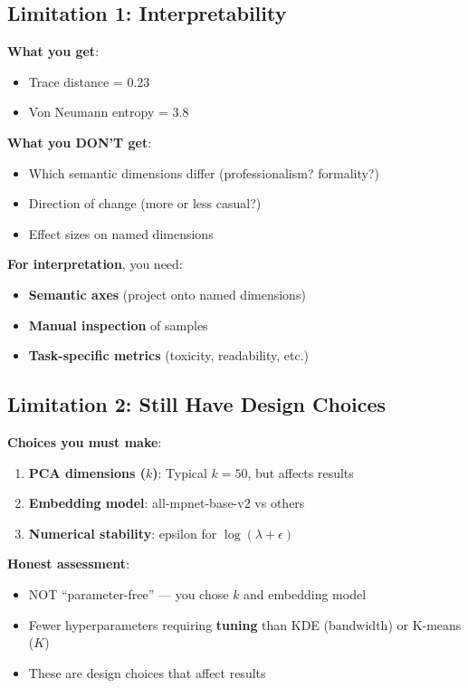 \documentclass[11pt]{article}
\newcommand{\cmark}{✓}
\newcommand{\xmark}{✗}
\newcommand{\wmark}{⚠}
\begin{document}
\subsection{Limitation 1: Interpretability}

\textbf{What you get}:
\begin{itemize}
\item Trace distance = 0.23
\item Von Neumann entropy = 3.8
\end{itemize}

\textbf{What you DON'T get}:
\begin{itemize}
\item Which semantic dimensions differ (professionalism? formality?)
\item Direction of change (more or less casual?)
\item Effect sizes on named dimensions
\end{itemize}

\textbf{For interpretation}, you need:
\begin{itemize}
\item \textbf{Semantic axes} (project onto named dimensions)
\item \textbf{Manual inspection} of samples
\item \textbf{Task-specific metrics} (toxicity, readability, etc.)
\end{itemize}

\subsection{Limitation 2: Still Have Design Choices}

\textbf{Choices you must make}:
\begin{enumerate}
\item \textbf{PCA dimensions ($k$)}: Typical $k=50$, but affects results
\item \textbf{Embedding model}: all-mpnet-base-v2 vs others
\item \textbf{Numerical stability}: epsilon for $\log(\lambda + \epsilon)$
\end{enumerate}

\textbf{Honest assessment}:
\begin{itemize}
\item[\xmark] NOT ``parameter-free'' --- you chose $k$ and embedding model
\item[\cmark] Fewer hyperparameters requiring \textbf{tuning} than KDE (bandwidth) or K-means ($K$)
\item[\wmark] These are design choices that affect results
\end{itemize}
\end{document}
